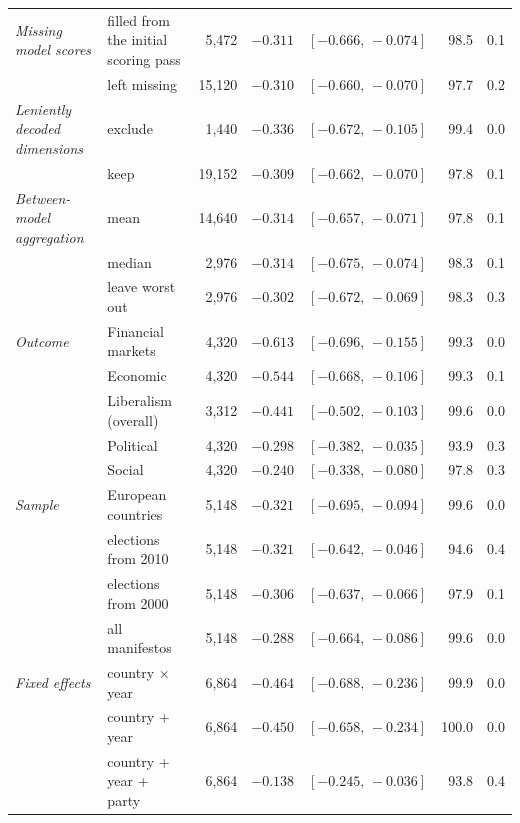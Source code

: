 \begin{table}[ht]
{\begin{tabular}{llrrcrr}
\midrule
\textit{Missing model scores} & filled from the initial scoring pass & 5,472 & $-0.311$ & $[-0.666,\,-0.074]$ & 98.5 & 0.1 \\
 & left missing & 15,120 & $-0.310$ & $[-0.660,\,-0.070]$ & 97.7 & 0.2 \\
\midrule
\textit{Leniently decoded dimensions} & exclude & 1,440 & $-0.336$ & $[-0.672,\,-0.105]$ & 99.4 & 0.0 \\
 & keep & 19,152 & $-0.309$ & $[-0.662,\,-0.070]$ & 97.8 & 0.1 \\
\midrule
\textit{Between-model aggregation} & mean & 14,640 & $-0.314$ & $[-0.657,\,-0.071]$ & 97.8 & 0.1 \\
 & median & 2,976 & $-0.314$ & $[-0.675,\,-0.074]$ & 98.3 & 0.1 \\
 & leave worst out & 2,976 & $-0.302$ & $[-0.672,\,-0.069]$ & 98.3 & 0.3 \\
\midrule
\textit{Outcome} & Financial markets & 4,320 & $-0.613$ & $[-0.696,\,-0.155]$ & 99.3 & 0.0 \\
 & Economic & 4,320 & $-0.544$ & $[-0.668,\,-0.106]$ & 99.3 & 0.1 \\
 & Liberalism (overall) & 3,312 & $-0.441$ & $[-0.502,\,-0.103]$ & 99.6 & 0.0 \\
 & Political & 4,320 & $-0.298$ & $[-0.382,\,-0.035]$ & 93.9 & 0.3 \\
 & Social & 4,320 & $-0.240$ & $[-0.338,\,-0.080]$ & 97.8 & 0.3 \\
\midrule
\textit{Sample} & European countries & 5,148 & $-0.321$ & $[-0.695,\,-0.094]$ & 99.6 & 0.0 \\
 & elections from 2010 & 5,148 & $-0.321$ & $[-0.642,\,-0.046]$ & 94.6 & 0.4 \\
 & elections from 2000 & 5,148 & $-0.306$ & $[-0.637,\,-0.066]$ & 97.9 & 0.1 \\
 & all manifestos & 5,148 & $-0.288$ & $[-0.664,\,-0.086]$ & 99.6 & 0.0 \\
\midrule
\textit{Fixed effects} & country $\times$ year & 6,864 & $-0.464$ & $[-0.688,\,-0.236]$ & 99.9 & 0.0 \\
 & country + year & 6,864 & $-0.450$ & $[-0.658,\,-0.234]$ & 100.0 & 0.0 \\
 & country + year + party & 6,864 & $-0.138$ & $[-0.245,\,-0.036]$ & 93.8 & 0.4 \\
\bottomrule
\end{tabular}}
\end{table}
